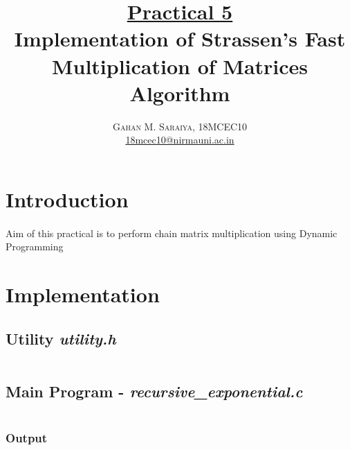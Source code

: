\documentclass[paper=letter, fontsize=12pt]{article}
\title{\vspace{-15mm}\fontsize{24pt}{10pt}\selectfont\textbf{
		\underline{Practical 5}\\Implementation of Strassen’s Fast Multiplication of Matrices Algorithm}} %
\author{\large{\textsc{
		Gahan M. Saraiya, 18MCEC10 }}\\[2mm]
\normalsize \href{mailto:18mcec10@nirmauni.ac.in}{18mcec10@nirmauni.ac.in}\\[2mm] %
}
\date{}
\begin{document}
\maketitle %
\thispagestyle{fancy} %

\section{Introduction}
\paragraph{}
Aim of this practical is to perform chain matrix multiplication using Dynamic Programming

\section{Implementation}

\subsection{Utility \textbf{\textit{utility.h}}}
\inputminted[frame=lines, breaklines, linenos]{c}{../../utils/utility.h}

\subsection{Main Program - \textbf{\textit{recursive\_exponential.c}}}
\inputminted[frame=lines, breaklines, linenos]{c}{../chain_matrix_multiplication_DP.c}

\subsubsection{Output}
\inputminted[frame=lines, breaklines, linenos]{text}{../output.txt}
%
\end{document}
